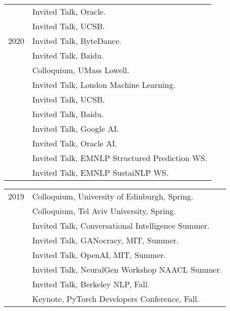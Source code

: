 \documentclass[10pt]{article}
\begin{document}
\begin{tabular}{lp{11.5cm}}
	 & \ind   Invited Talk, Oracle.                         \\
	 & \ind   Invited Talk, UCSB.                           \\
	2020
	 & \ind   Invited Talk, ByteDance.                      \\
	 & \ind   Invited Talk, Baidu.                          \\
	 & \ind   Colloquium, UMass Lowell.                     \\
	 & \ind   Invited Talk, London Machine Learning.        \\
	 & \ind   Invited Talk, UCSB.                           \\
	 & \ind   Invited Talk, Baidu.                          \\
	 & \ind   Invited Talk, Google AI.                      \\
	 & \ind   Invited Talk, Oracle AI.                      \\
	 & \ind   Invited Talk, EMNLP Structured Prediction WS. \\
	 & \ind   Invited Talk, EMNLP SustaiNLP WS.             \\
\end{tabular}

\hspace{-1cm} \begin{tabular}{lp{11.5cm}}
	2019
	 & \ind   Colloquium, University of Edinburgh, Spring.      \\
	 & \ind   Colloquium, Tel Aviv University, Spring.          \\
	 & \ind   Invited Talk, Conversational Intelligence Summer. \\
	 & \ind   Invited Talk, GANocracy, MIT, Summer.             \\
	 & \ind   Invited Talk, OpenAI, MIT, Summer.                \\
	 & \ind   Invited Talk, NeuralGen Workshop NAACL Summer.    \\
	 & \ind   Invited Talk, Berkeley NLP, Fall.                 \\
	 & \ind   Keynote, PyTorch Developers Conference, Fall.     \\
\end{tabular}
\end{document}
